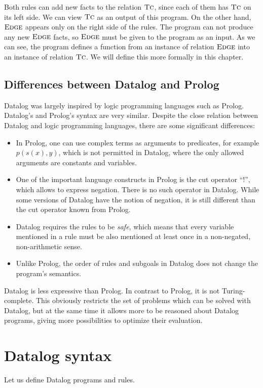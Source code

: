 Both rules can add new facts to the relation $\textsc{Tc}$, since each of them has $\textsc{Tc}$ on its left side. We can view $\textsc{Tc}$ as an output of this program. On the other hand, $\textsc{Edge}$ appears only on the right side of the rules. The program can not produce any new $\textsc{Edge}$ facts, so $\textsc{Edge}$ must be given to the program as an input. As we can see, the program defines a function from an instance of relation $\textsc{Edge}$ into an instance of relation $\textsc{Tc}$. We will define this more formally in this chapter.

\subsection{Differences between Datalog and Prolog}
Datalog was largely inspired by logic programming languages such as Prolog. Datalog's and Prolog's syntax are very similar.
Despite the close relation between Datalog and logic programming languages, there are some significant differences:

\begin{itemize}
\item In Prolog, one can use complex terms as arguments to predicates, for example $p(s(x), y)$, which is not permitted in Datalog, where the only allowed arguments are constants and variables.
\item One of the important language constructs in Prolog is the cut operator ``!'', which allows to express negation. There is no such operator in Datalog. While some versions of Datalog have the notion of negation, it is still different than the cut operator known from Prolog.
\item Datalog requires the rules to be \emph{safe}, which means that every variable mentioned in a rule must be also mentioned at least once in a non-negated, non-arithmetic sense.
\item Unlike Prolog, the order of rules and subgoals in Datalog does not change the program's semantics.
\end{itemize}

Datalog is less expressive than Prolog. In contrast to Prolog, it is not Turing-complete. This obviously restricts the set of problems which can be solved with Datalog, but at the same time it allows more to be reasoned about Datalog programs, giving more possibilities to optimize their evaluation.

\section{Datalog syntax}
Let us define Datalog programs and rules.

